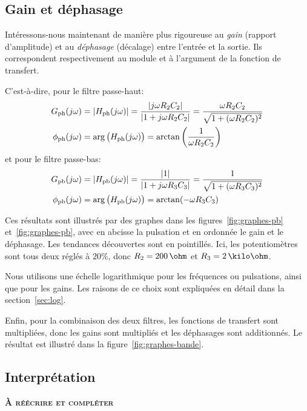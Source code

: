 \subsection{Gain et déphasage}

Intéressons-nous maintenant de manière plus rigoureuse
au \emph{gain} (rapport d'amplitude) et au  \emph{déphasage} (décalage)
entre l'entrée et la sortie.
Ils correspondent respectivement au module et à l'argument de la fonction de
transfert.

C'est-à-dire, pour le filtre passe-haut:
\begin{align}
    G_{\mathrm{ph}}(j\omega) &= |H_{\mathrm{ph}}(j\omega)|
    = \frac{|j\omega R_2C_2|}{|1 + j\omega R_2C_2|}
    = \frac{\omega R_2C_2}{\sqrt{1+(\omega R_2C_2)^2}}\\
    \phi_{\mathrm{ph}}(j\omega) &= \arg\big(H_{\mathrm{ph}}(j\omega)\big)
    = \arctan\left(\frac{1}{\omega R_2C_2}\right)
\end{align}
et pour le filtre passe-bas:
\begin{align}
    G_{\mathrm{pb}}(j\omega) &= |H_{\mathrm{pb}}(j\omega)|
    = \frac{|1|}{|1 + j\omega R_3C_3|}
    = \frac{1}{\sqrt{1+(\omega R_3C_3)^2}}\\
    \phi_{\mathrm{pb}}(j\omega) &= \arg\big(H_{\mathrm{pb}}(j\omega)\big)
    = \arctan(-\omega R_3C_3)
\end{align}

Ces résultats sont illustrés par des graphes dans
les figures~\ref{fig:graphes-pb} et~\ref{fig:graphes-pb}, avec en abcisse la pulsation
et en ordonnée le gain et le déphasage.
Les tendances découvertes sont en pointillés.
Ici, les potentiomètres sont tous deux réglés à $20\%$,
donc $R_2 = 200\,\ohm$ et $R_3 = 2\,\kilo\ohm$.

Nous utilisons une échelle logarithmique pour les fréquences
ou pulsations, ainsi que pour les gains.
Les raisons de ce choix sont expliquées en détail dans
la section~\ref{sec:log}.

Enfin, pour la combinaison des deux filtres,
les fonctions de transfert sont multipliées,
donc les gains sont multipliés et les déphasages sont additionnés.
Le résultat est illustré dans la figure~\ref{fig:graphes-bande}.

\subsection{Interprétation}

\textbf{\textsc{À réécrire et compléter}}

